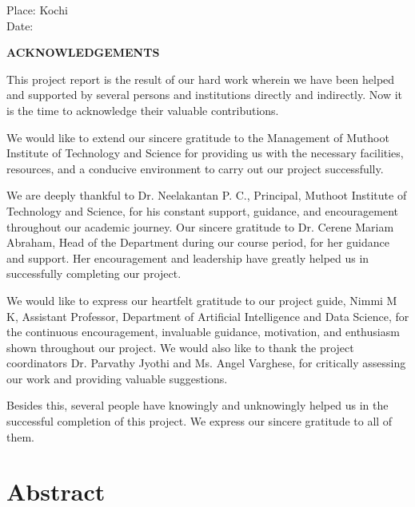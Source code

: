 \documentclass[12pt,a4paper]{report}
\begin{document}
\vspace{1cm}
\noindent Place: Kochi \\
Date:

\newpage

\newpage
{}
\begin{center}
    \Large\textbf{ACKNOWLEDGEMENTS}
\end{center}
\vspace{1cm}
\noindent
This project report is the result of our hard work wherein we have been helped and supported by several persons and institutions directly and indirectly. Now it is the time to acknowledge their valuable contributions.
\par\vspace{0.5cm}
\noindent
We would like to extend our sincere gratitude to the Management of Muthoot Institute of Technology and Science for providing us with the necessary facilities, resources, and a conducive environment to carry out our project successfully.
\par\vspace{0.5cm}
\noindent
We are deeply thankful to Dr. Neelakantan P. C., Principal, Muthoot Institute of Technology and Science, for his constant support, guidance, and encouragement throughout our academic journey. Our sincere gratitude to Dr. Cerene Mariam Abraham, Head of the Department during our course period, for her guidance and support. Her encouragement and leadership have greatly helped us in successfully completing our project.
\par\vspace{0.5cm}
\noindent
We would like to express our heartfelt gratitude to our project guide, Nimmi M K, Assistant Professor, Department of Artificial Intelligence and Data Science, for the continuous encouragement, invaluable guidance, motivation, and enthusiasm shown throughout our project. We would also like to thank the project coordinators Dr. Parvathy Jyothi and  Ms. Angel Varghese, for critically assessing our work and providing valuable suggestions.
\par\vspace{0.5cm}
\noindent
Besides this, several people have knowingly and unknowingly helped us in the successful completion of this project. We express our sincere gratitude to all of them.



\newpage
\chapter*{Abstract}
\end{document}
